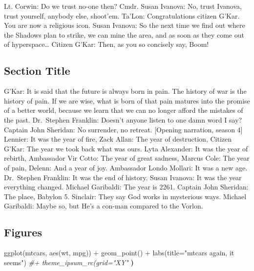\documentclass[
  10pt,
  twoside]{article}
\newenvironment{Shaded}{\begin{snugshade}}{\end{snugshade}}
\newcommand{\AttributeTok}[1]{\textcolor[rgb]{0.77,0.63,0.00}{#1}}
\newcommand{\CommentTok}[1]{\textcolor[rgb]{0.56,0.35,0.01}{\textit{#1}}}
\newcommand{\ErrorTok}[1]{\textcolor[rgb]{0.64,0.00,0.00}{\textbf{#1}}}
\newcommand{\FunctionTok}[1]{\textcolor[rgb]{0.00,0.00,0.00}{#1}}
\newcommand{\NormalTok}[1]{#1}
\newcommand{\SpecialCharTok}[1]{\textcolor[rgb]{0.00,0.00,0.00}{#1}}
\newcommand{\StringTok}[1]{\textcolor[rgb]{0.31,0.60,0.02}{#1}}
\begin{document}
Lt. Corwin: Do we trust no-one then? Cmdr. Susan Ivanova: No, trust Ivanova, trust yourself, anybody else, shoot'em. Ta'Lon: Congratulations citizen G'Kar. You are now a religious icon. Susan Ivanova: So the next time we find out where the Shadows plan to strike, we can mine the area, and as soon as they come out of hyperspace\ldots{} Citizen G'Kar: Then, as you so concisely say, Boom!

\hypertarget{section-title}{%
\subsection{Section Title}\label{section-title}}

G'Kar: It is said that the future is always born in pain. The history of war is the history of pain. If we are wise, what is born of that pain matures into the promise of a better world, because we learn that we can no longer afford the mistakes of the past. Dr.~Stephen Franklin: Doesn't anyone listen to one damn word I say? Captain John Sheridan: No surrender, no retreat. {[}Opening narration, season 4{]} Lennier: It was the year of fire, Zack Allan: The year of destruction, Citizen G'Kar: The year we took back what was ours. Lyta Alexander: It was the year of rebirth, Ambassador Vir Cotto: The year of great sadness, Marcus Cole: The year of pain, Delenn: And a year of joy. Ambassador Londo Mollari: It was a new age. Dr.~Stephen Franklin: It was the end of history. Susan Ivanova: It was the year everything changed. Michael Garibaldi: The year is 2261. Captain John Sheridan: The place, Babylon 5. Sinclair: They say God works in mysterious ways. Michael Garibaldi: Maybe so, but He's a con-man compared to the Vorlon.

\hypertarget{figures}{%
\subsection{Figures}\label{figures}}

\begin{Shaded}
\begin{Highlighting}[]
\FunctionTok{ggplot}\NormalTok{(mtcars, }\FunctionTok{aes}\NormalTok{(wt, mpg)) }\SpecialCharTok{+}
  \FunctionTok{geom\_point}\NormalTok{() }\SpecialCharTok{+}
  \FunctionTok{labs}\NormalTok{(}\AttributeTok{title=}\StringTok{"mtcars again, it seems"}\NormalTok{) }\CommentTok{\#+  theme\_ipsum\_rc(grid="XY" }
                 \ErrorTok{)}
\end{Highlighting}
\end{Shaded}
\end{document}
